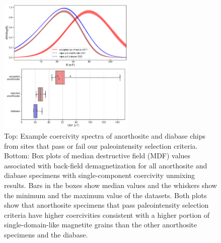 \begin{figure}
\noindent\includegraphics[width=0.58\textwidth]{figure/Zhang2022/coercivity.pdf}
\centering
\caption[Beaver River anorthosite xenoliths coercivity spectra and median destructive field (MDF) values associated with back-field demagnetization]{\footnotesize{Top: Example coercivity spectra of anorthosite and diabase chips from sites that pass or fail our paleointensity selection criteria. Bottom: Box plots of median destructive field (MDF) values associated with back-field demagnetization for all anorthosite and diabase specimens with single-component coercivity unmixing results. Bars in the boxes show median values and the whiskers show the minimum and the maximum value of the datasets. Both plots show that anorthosite specimens that pass paleointensity selection criteria have higher coercivities consistent with a higher portion of single-domain-like magnetite grains than the other anorthosite specimens and the diabase.}}
\label{fig:coercivity}
\end{figure}

